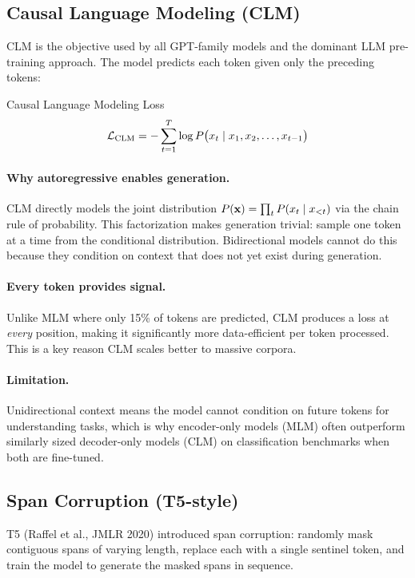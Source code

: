\subsection{Causal Language Modeling (CLM)}

CLM is the objective used by all GPT-family models and the dominant LLM
pre-training approach.  The model predicts each token given only the
preceding tokens:

\begin{mathresult}{Causal Language Modeling Loss}
\[
    \mathcal{L}_{\text{CLM}} = - \sum_{t=1}^{T} \log P\bigl(x_t \mid x_1, x_2, \ldots, x_{t-1}\bigr)
\]
\end{mathresult}

\paragraph{Why autoregressive enables generation.}
CLM directly models the joint distribution $P(\mathbf{x}) = \prod_t P(x_t \mid x_{<t})$
via the chain rule of probability.  This factorization makes generation trivial:
sample one token at a time from the conditional distribution.  Bidirectional
models cannot do this because they condition on context that does not yet exist
during generation.

\paragraph{Every token provides signal.}
Unlike MLM where only 15\% of tokens are predicted, CLM produces a loss at
\emph{every} position, making it significantly more data-efficient per token
processed.  This is a key reason CLM scales better to massive corpora.

\paragraph{Limitation.}
Unidirectional context means the model cannot condition on future tokens for
understanding tasks, which is why encoder-only models (MLM) often outperform
similarly sized decoder-only models (CLM) on classification benchmarks when
both are fine-tuned.

\subsection{Span Corruption (T5-style)}

T5 (Raffel et al., JMLR 2020) introduced span corruption: randomly mask
contiguous spans of varying length, replace each with a single sentinel token,
and train the model to generate the masked spans in sequence.

